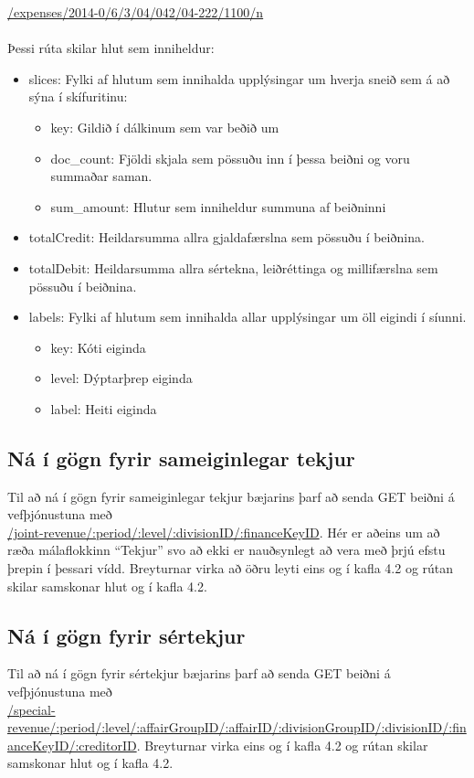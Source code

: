 \documentclass{article}
\theoremstyle{blueP}
\theoremstyle{greenS}
\begin{document}
\url{/expenses/2014-0/6/3/04/042/04-222/1100/n} \\ \\
Þessi rúta skilar hlut sem inniheldur:
\begin{itemize}
    \item slices: Fylki af hlutum sem innihalda upplýsingar um hverja sneið sem á að sýna í skífuritinu:
    \begin{itemize}
        \item key: Gildið í dálkinum sem var beðið um
        \item doc\_count: Fjöldi skjala sem pössuðu inn í þessa beiðni og voru summaðar saman.
        \item sum\_amount: Hlutur sem inniheldur summuna af beiðninni
    \end{itemize}
    \item totalCredit: Heildarsumma allra gjaldafærslna sem pössuðu í beiðnina.
    \item totalDebit: Heildarsumma allra sértekna, leiðréttinga og millifærslna sem pössuðu í beiðnina.
    \item labels: Fylki af hlutum sem innihalda allar upplýsingar um öll eigindi í síunni.
    \begin{itemize}
        \item key: Kóti eiginda
        \item level: Dýptarþrep eiginda
        \item label: Heiti eiginda
    \end{itemize}
\end{itemize}

\subsection{Ná í gögn fyrir sameiginlegar tekjur}
Til að ná í gögn fyrir sameiginlegar tekjur bæjarins þarf að senda GET beiðni á vefþjónustuna með \\ \url{/joint-revenue/:period/:level/:divisionID/:financeKeyID}. Hér er aðeins um að ræða málaflokkinn ``Tekjur'' svo að ekki er nauðsynlegt að vera með þrjú efstu þrepin í þessari vídd. Breyturnar virka að öðru leyti eins og í kafla 4.2 og rútan skilar samskonar hlut og í kafla 4.2.

\subsection{Ná í gögn fyrir sértekjur}
Til að ná í gögn fyrir sértekjur bæjarins þarf að senda GET beiðni á vefþjónustuna með \\ \url{/special-revenue/:period/:level/:affairGroupID/:affairID/:divisionGroupID/:divisionID/:financeKeyID/:creditorID}. Breyturnar virka eins og í kafla 4.2 og rútan skilar samskonar hlut og í kafla 4.2.
\end{document}
